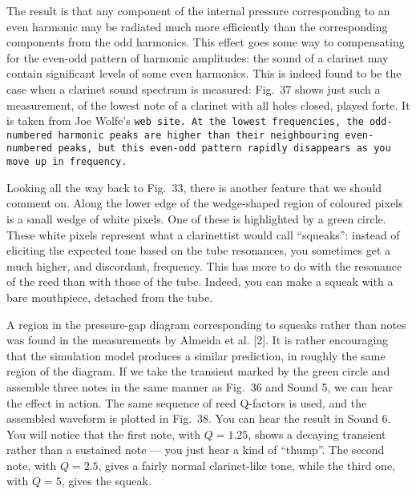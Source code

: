   The result is that any component of the internal pressure corresponding to an 
  even harmonic may be radiated much more efficiently than the corresponding 
  components from the odd harmonics. This effect goes some way to compensating 
  for the even-odd pattern of harmonic amplitudes: the sound of a clarinet may 
  contain significant levels of some even harmonics. This is indeed found to be 
  the case when a clarinet sound spectrum is measured: Fig.\ 37 shows just such 
  a measurement, of the lowest note of a clarinet with all holes closed, played 
  forte. It is taken from Joe Wolfe's \tt{}web site\rm{}. At the lowest 
  frequencies, the odd-numbered harmonic peaks are higher than their 
  neighbouring even-numbered peaks, but this even-odd pattern rapidly 
  disappears as you move up in frequency. 


  Looking all the way back to Fig.\ 33, there is another feature that we should 
  comment on. Along the lower edge of the wedge-shaped region of coloured 
  pixels is a small wedge of white pixels. One of these is highlighted by a 
  green circle. These white pixels represent what a clarinettist would call 
  “squeaks”: instead of eliciting the expected tone based on the tube 
  resonances, you sometimes get a much higher, and discordant, frequency. This 
  has more to do with the resonance of the reed than with those of the tube. 
  Indeed, you can make a squeak with a bare mouthpiece, detached from the tube. 

  A region in the pressure-gap diagram corresponding to squeaks rather than 
  notes was found in the measurements by Almeida et al. [2]. It is rather 
  encouraging that the simulation model produces a similar prediction, in 
  roughly the same region of the diagram. If we take the transient marked by 
  the green circle and assemble three notes in the same manner as Fig.\ 36 and 
  Sound 5, we can hear the effect in action. The same sequence of reed 
  Q-factors is used, and the assembled waveform is plotted in Fig.\ 38. You can 
  hear the result in Sound 6. You will notice that the first note, with 
  $Q=1.25$, shows a decaying transient rather than a sustained note --- you 
  just hear a kind of ``thump''. The second note, with $Q=2.5$, gives a fairly 
  normal clarinet-like tone, while the third one, with $Q=5$, gives the squeak. 


